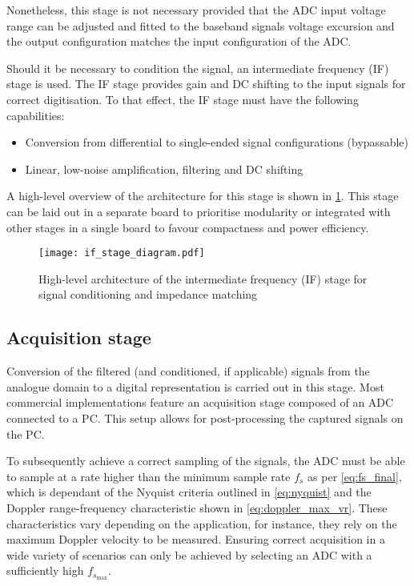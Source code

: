 Nonetheless, this stage is not necessary provided that the ADC input voltage range can be adjusted and fitted to the baseband signals voltage excursion and the output configuration matches the input configuration of the ADC.

Should it be necessary to condition the signal, an intermediate frequency (IF) stage is used. The IF stage provides gain and DC shifting to the input signals for correct digitisation. To that effect, the IF stage must have the following capabilities:
\begin{itemize}
	\item Conversion from differential to single-ended signal configurations (bypassable)
	\item Linear, low-noise amplification, filtering and DC shifting
\end{itemize}

A high-level overview of the architecture for this stage is shown in \cref{fig:if_general}. This stage can be laid out in a separate board to prioritise modularity or integrated with other stages in a single board to favour compactness and power efficiency.

\begin{figure}[ht]
	\centering
	\texttt{[image: if\_stage\_diagram.pdf]}
	\caption{High-level architecture of the intermediate frequency (IF) stage for signal conditioning and impedance matching \label{fig:if_general}}
\end{figure}

\subsection{Acquisition stage}

Conversion of the filtered (and conditioned, if applicable) signals from the analogue domain to a digital representation is carried out in this stage. Most commercial implementations feature an acquisition stage composed of an ADC connected to a PC. This setup allows for post-processing the captured signals on the PC.

To subsequently achieve a correct sampling of the signals, the ADC must be able to sample at a rate higher than the minimum sample rate $f_s$ as per \cref{eq:fs_final}, which is dependant of the Nyquist criteria outlined in \cref{eq:nyquist} and the Doppler range-frequency characteristic shown in \cref{eq:doppler_max_vr}. These characteristics vary depending on the application, for instance, they rely on the maximum Doppler velocity to be measured. Ensuring correct acquisition in a wide variety of scenarios can only be achieved by selecting an ADC with a sufficiently high $f_{s_{\max}}$.

